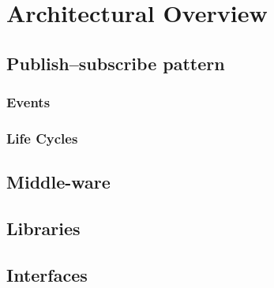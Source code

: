 \chapter{Architectural Overview}
\label{ch:architectural_overview}

\section{Publish–subscribe pattern}
\subsection{Events}
\subsection{Life Cycles}


\section{Middle-ware}
\section{Libraries}
\section{Interfaces}